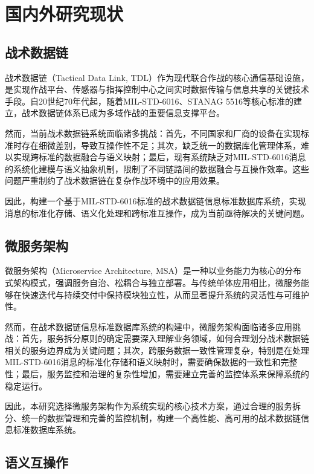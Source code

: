 \section{国内外研究现状}

\subsection{战术数据链}

战术数据链（Tactical Data Link, TDL）作为现代联合作战的核心通信基础设施，是实现作战平台、传感器与指挥控制中心之间实时数据传输与信息共享的关键技术手段。自20世纪70年代起，随着MIL-STD-6016、STANAG 5516等核心标准的建立，战术数据链体系已成为多域作战的重要信息支撑平台。

然而，当前战术数据链系统面临诸多挑战：首先，不同国家和厂商的设备在实现标准时存在细微差别，导致互操作性不足；其次，缺乏统一的数据库化管理体系，难以实现跨标准的数据融合与语义映射；最后，现有系统缺乏对MIL-STD-6016消息的系统化建模与语义抽象机制，限制了不同链路间的数据融合与互操作效率。这些问题严重制约了战术数据链在复杂作战环境中的应用效果。

因此，构建一个基于MIL-STD-6016标准的战术数据链信息标准数据库系统，实现消息的标准化存储、语义化处理和跨标准互操作，成为当前亟待解决的关键问题。

\subsection{微服务架构}

微服务架构（Microservice Architecture, MSA）是一种以业务能力为核心的分布式架构模式，强调服务自治、松耦合与独立部署。与传统单体应用相比，微服务能够在快速迭代与持续交付中保持模块独立性，从而显著提升系统的灵活性与可维护性。

然而，在战术数据链信息标准数据库系统的构建中，微服务架构面临诸多应用挑战：首先，服务拆分原则的确定需要深入理解业务领域，如何合理划分战术数据链相关的服务边界成为关键问题；其次，跨服务数据一致性管理复杂，特别是在处理MIL-STD-6016消息的标准化存储和语义映射时，需要确保数据的一致性和完整性；最后，服务监控和治理的复杂性增加，需要建立完善的监控体系来保障系统的稳定运行。

因此，本研究选择微服务架构作为系统实现的核心技术方案，通过合理的服务拆分、统一的数据管理和完善的监控机制，构建一个高性能、高可用的战术数据链信息标准数据库系统。


\subsection{语义互操作}

